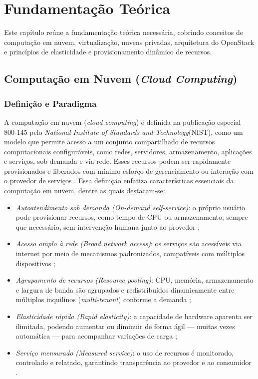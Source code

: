 \chapter{Fundamentação Teórica}
\setcounter{table}{0}

Este capítulo reúne a fundamentação teórica necessária, cobrindo conceitos de computação em nuvem, virtualização, nuvens privadas, arquitetura do OpenStack e princípios de elasticidade e provisionamento dinâmico de recursos.

\section{Computação em Nuvem (\textit{Cloud Computing})}
\label{sec:cloud-computing}

\subsection{Definição e Paradigma}

A computação em nuvem (\textit{cloud computing}) é definida na publicação especial 800-145 pelo \textit{National Institute of Standards and Technology}(NIST), como um modelo que permite acesso a um conjunto compartilhado de recursos computacionais configuráveis, como redes, servidores, armazenamento, aplicações e serviços,  sob demanda e via rede. Esses recursos podem ser rapidamente provisionados e liberados com mínimo esforço de gerenciamento ou interação com o provedor de serviços \cite{mell2011}. Essa definição enfatiza características essenciais da computação em nuvem, dentre as quais destacam-se:

\begin{itemize}
    \item \emph{Autoatendimento sob demanda (\textit{On-demand self-service})}: o próprio usuário pode provisionar recursos, como tempo de CPU ou armazenamento, sempre que necessário, sem intervenção humana junto ao provedor \cite{mell2011};
    \item \emph{Acesso amplo à rede (\textit{Broad network access})}: os serviços são acessíveis via internet por meio de mecanismos padronizados, compatíveis com múltiplos dispositivos \cite{mell2011};
    \item \emph{Agrupamento de recursos (\textit{Resource pooling})}: CPU, memória, armazenamento e largura de banda são agrupados e redistribuídos dinamicamente entre múltiplos inquilinos (\textit{multi-tenant}) conforme a demanda \cite{mell2011};
    \item \emph{Elasticidade rápida (\textit{Rapid elasticity})}: a capacidade de hardware aparenta ser ilimitada, podendo aumentar ou diminuir de forma ágil — muitas vezes automática — para acompanhar variações de carga \cite{mell2011};
    \item \emph{Serviço mensurado (\textit{Measured service})}: o uso de recursos é monitorado, controlado e relatado, garantindo transparência ao provedor e ao consumidor \cite{mell2011}.
\end{itemize}

